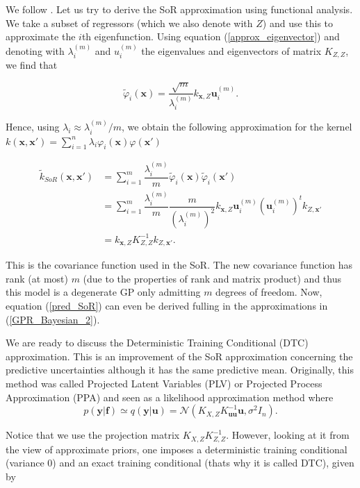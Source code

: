 \documentclass[12pt,a4paper,oneside]{book}
\begin{document}
We follow \cite{GPRbook}. Let us try to derive the SoR approximation using functional analysis. We take a subset of regressors (which we also denote with $Z$) and use this to approximate the $i$th eigenfunction. Using equation (\ref{approx_eigenvector}) and denoting with $\lambda_i^{(m)}$ and $u_i^{(m)}$ the eigenvalues and eigenvectors of matrix $K_{Z,Z}$, we find that 

\begin{equation}
\tilde{\varphi}_i (\bm{x}) = \dfrac{\sqrt{m}}{\lambda_i^{(m)}} k_{\bm{x},Z} \bm{u}_i^{(m)}.
\end{equation}

Hence, using $\lambda_i  \approx  \lambda_i^{(m)}/m$, we obtain the following approximation for the kernel $k(\bm{x}, \bm{x}') = \sum\nolimits_{i=1}^n \lambda_i \varphi_i(\bm{x}) \varphi(\bm{x}')$ 

\begin{align}
\tilde{k}_{SoR}(\bm{x}, \bm{x}') &= \sum\limits_{i=1}^m \dfrac{\lambda_i^{(m)}}{m} \tilde{\varphi}_i(\bm{x})\tilde{\varphi}_i(\bm{x}') \nonumber  \\
&= \sum\limits_{i=1}^m  \dfrac{\lambda_i^{(m)}}{m} \dfrac{m}{(\lambda_i^{(m)})^2} k_{\bm{x},Z}  \bm{u}_i^{(m)} (\bm{u}_i^{(m)})^t k_{Z, \bm{x}'} \nonumber \\
&= k_{\bm{x},Z} K_{Z,Z}^{-1} k_{Z, \bm{x}'}.
\end{align}

This is the covariance function used in the SoR. The new covariance function has rank (at most) $m$ (due to the properties of rank and matrix product) and thus this model is a degenerate GP only admitting  $m$ degrees of freedom. Now, equation (\ref{pred_SoR}) can even be derived fulling in the approximations in (\ref{GPR_Bayesian_2}).   


We are ready to discuss the Deterministic Training Conditional (DTC)  approximation. This is an improvement of the SoR approximation  concerning the predictive uncertainties although it has the same predictive mean.  Originally, this method was called Projected Latent Variables (PLV) or Projected Process Approximation (PPA) and seen as a likelihood approximation method where 
\begin{equation}\label{llh_dtc}
p(\bm{y}|\bm{f}) \simeq q(\bm{y}|\bm{u}) = \mathcal{N}(K_{X,Z} K^{-1}_{\bm{u} \bm{u}} \bm{u}, \sigma^2 I_n).
\end{equation}

Notice that we use the projection matrix $K_{X,Z} K^{-1}_{Z,Z}$.  However, looking at it from the view of approximate priors, one imposes a deterministic training conditional (variance $0$) and an exact training conditional (thats why it is called DTC), given by
\end{document}
